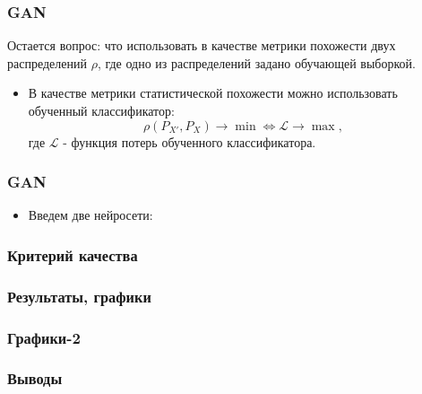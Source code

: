 \documentclass[9pt]{beamer}
\begin{document}
\begin{frame}\frametitle{GAN}
	Остается вопрос: что использовать в качестве метрики похожести двух распределений $\rho$, где одно из распределений задано обучающей выборкой.
	\begin{itemize}
		\item В качестве метрики статистической похожести можно использовать обученный классификатор:
		$$ \rho(P_{X'}, P_X) \longrightarrow \min \Leftrightarrow \mathcal{L} \longrightarrow \max, $$
		где $\mathcal{L}$ - функция потерь обученного классификатора.
	\end{itemize}
\end{frame}

\begin{frame}\frametitle{GAN}
	\begin{itemize}
		\item Введем две нейросети:
	\end{itemize}
\end{frame}

\begin{frame}\frametitle{Критерий качества}
\end{frame}

\begin{frame}\frametitle{Результаты, графики}
\end{frame}

\begin{frame}\frametitle{Графики-2}
\end{frame}

\begin{frame}\frametitle{Выводы}
\end{frame}
\end{document}
